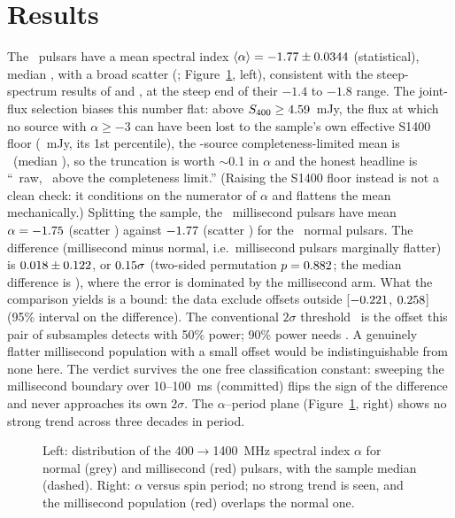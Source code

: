 \documentclass[twocolumn]{aastex631}
\begin{document}
\section{Results}
The \psrN\ pulsars have a mean spectral index $\langle\alpha\rangle=-1.77\pm0.0344$
(statistical), median \psrMedianAlpha, with a broad scatter (\psrStdAlpha; Figure~\ref{fig:spectra}, left), consistent with the steep-spectrum results of \citet{bates2013} and \citet{jankowski2018},
at the steep end of their $-1.4$ to $-1.8$ range. The joint-flux selection biases this number flat:
above $S_{400}\geq4.59$~mJy, the flux at which no source with $\alpha\geq-3$ can have been lost to the sample's own effective S1400 floor (\psrCompleteFloor~mJy, its 1st percentile), the \psrCompleteN-source completeness-limited mean is \psrCompleteMean\ (median
\psrCompleteMedian), so the truncation is worth $\sim$0.1 in $\alpha$ and the honest headline is
``\psrMeanAlpha\ raw, \psrCompleteMean\ above the completeness limit.'' (Raising the S1400
floor instead is not a clean check: it conditions on the numerator of $\alpha$ and flattens the
mean mechanically.) Splitting the sample, the \psrNmsp\ millisecond pulsars have mean
$\alpha=-1.75$ (scatter \psrStdAlphaMsp) against $-1.77$ (scatter
\psrStdAlphaNormal) for the \psrNnormal\ normal pulsars. The difference (millisecond minus normal,
i.e.\ millisecond pulsars marginally flatter) is $0.018\pm0.122$, or
$0.15\sigma$ (two-sided permutation $p=0.882$; the median difference is
\psrMedianDiff), where the error is dominated by the millisecond arm. What the comparison
yields is a bound: the data exclude offsets outside [$-0.221$, $0.258$] (95\% interval
on the difference). The conventional $2\sigma$ threshold \psrAlphaResolvable\ is the offset this
pair of subsamples detects with 50\% power; 90\% power needs \psrNinetyPower. A genuinely flatter
millisecond population with a small offset would be indistinguishable from none here. The verdict
survives the one free classification constant: sweeping the millisecond boundary over 10--100~ms
(committed) flips the sign of the difference and never approaches its own $2\sigma$. The
$\alpha$--period plane (Figure~\ref{fig:spectra}, right) shows no strong trend across three decades
in period.

\begin{figure}
\caption{Left: distribution of the 400$\to$1400~MHz spectral index $\alpha$ for normal (grey)
and millisecond (red) pulsars, with the sample median (dashed). Right: $\alpha$ versus spin
period; no strong trend is seen, and the millisecond population (red) overlaps the normal one.}
\label{fig:spectra}
\end{figure}
\end{document}
